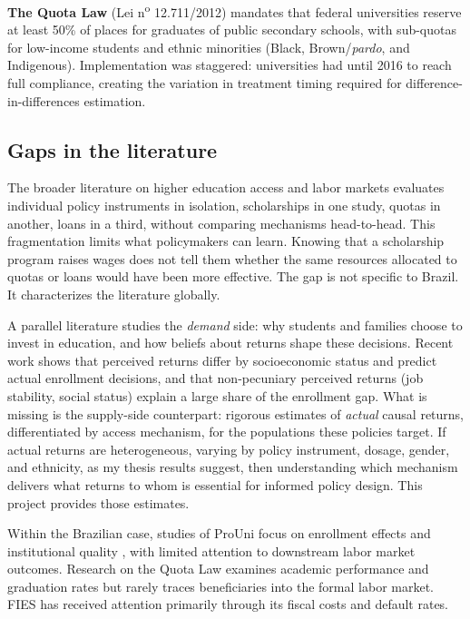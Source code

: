 \documentclass[a4paper,11pt]{article}
\begin{document}
\textbf{The Quota Law} (Lei n\textsuperscript{o} 12.711/2012) mandates that federal universities reserve at least 50\% of places for graduates of public secondary schools, with sub-quotas for low-income students and ethnic minorities (Black, Brown/\textit{pardo}, and Indigenous). Implementation was staggered: universities had until 2016 to reach full compliance, creating the variation in treatment timing required for difference-in-differences estimation.

\subsection{Gaps in the literature}

The broader literature on higher education access and labor markets evaluates individual policy instruments in isolation, scholarships in one study, quotas in another, loans in a third, without comparing mechanisms head-to-head. This fragmentation limits what policymakers can learn. Knowing that a scholarship program raises wages does not tell them whether the same resources allocated to quotas or loans would have been more effective. The gap is not specific to Brazil. It characterizes the literature globally.

A parallel literature studies the \textit{demand} side: why students and families choose to invest in education, and how beliefs about returns shape these decisions. Recent work shows that perceived returns differ by socioeconomic status and predict actual enrollment decisions, and that non-pecuniary perceived returns (job stability, social status) explain a large share of the enrollment gap. What is missing is the supply-side counterpart: rigorous estimates of \textit{actual} causal returns, differentiated by access mechanism, for the populations these policies target. If actual returns are heterogeneous, varying by policy instrument, dosage, gender, and ethnicity, as my thesis results suggest, then understanding which mechanism delivers what returns to whom is essential for informed policy design. This project provides those estimates.

Within the Brazilian case, studies of ProUni focus on enrollment effects \citep{cataldo2020} and institutional quality \citep{aprile2009}, with limited attention to downstream labor market outcomes. Research on the Quota Law examines academic performance and graduation rates but rarely traces beneficiaries into the formal labor market. FIES has received attention primarily through its fiscal costs and default rates.
\end{document}
